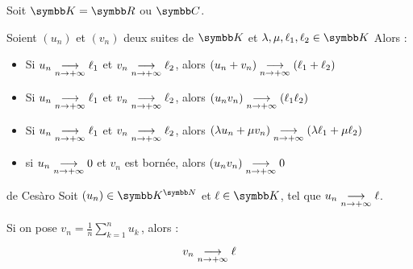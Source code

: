 \begin{theoreme}{}{}
    Soit $\K = \R$ ou $\C$. 

    Soient $(u_n)$ et $(v_n)$ deux suites de $\K$ et $\lambda, \mu, \ell_1, \ell_2 \in \K$ Alors : 

    \begin{itemize}
        \item Si $u_n \underset{n \to +\infty}{\longrightarrow} \ell_1$ et $v_n \underset{n \to +\infty}{\longrightarrow} \ell_2$, alors $(u_n + v_n) \underset{n \to +\infty}{\longrightarrow} (\ell_1 + \ell_2)$
        \item Si $u_n \underset{n \to +\infty}{\longrightarrow} \ell_1$ et $v_n \underset{n \to +\infty}{\longrightarrow} \ell_2$, alors $(u_n v_n) \underset{n \to +\infty}{\longrightarrow} (\ell_1 \ell_2)$
        \item Si $u_n \underset{n \to +\infty}{\longrightarrow} \ell_1$ et $v_n \underset{n \to +\infty}{\longrightarrow} \ell_2$, alors $(\lambda u_n + \mu v_n) \underset{n \to +\infty}{\longrightarrow} (\lambda \ell_1 + \mu \ell_2)$
        \item si $u_n \underset{n \to +\infty}{\longrightarrow} 0$ et $v_n$ est bornée, alors $(u_n v_n) \underset{n \to +\infty}{\longrightarrow} 0$
    \end{itemize}
\end{theoreme}

\begin{theoreme}{de Cesàro}{}
    Soit $(u_n) \in \K^{\N}$ et $\ell \in \K$, tel que $u_n \underset{n \to +\infty}{\longrightarrow} \ell$.
    
    Si on pose $\displaystyle v_n = \frac 1 n \sum_{k=1}^n u_k$\,, alors :
    \[v_n \underset{n \to +\infty}{\longrightarrow} \ell\]
\end{theoreme}


